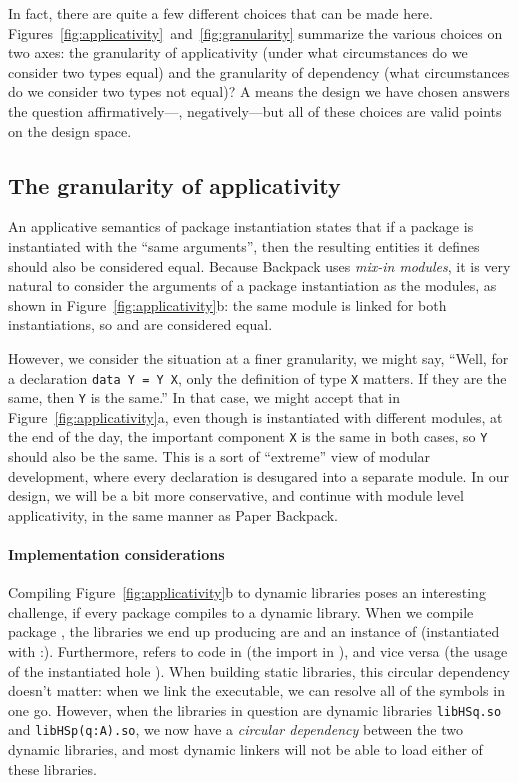 \documentclass{article}
\begin{document}
In fact, there are quite a few different choices that can be made here.
Figures~\ref{fig:applicativity}~and~\ref{fig:granularity} summarize the various
choices on two axes: the granularity of applicativity (under what circumstances
do we consider two types equal) and the granularity of dependency (what circumstances
do we consider two types not equal)?  A  means the design we have chosen
answers the question affirmatively---, negatively---but all of these choices
are valid points on the design space.

\subsection{The granularity of applicativity}

An applicative semantics of package instantiation states that if a package is
instantiated with the ``same arguments'', then the resulting entities it defines
should also be considered equal.  Because Backpack uses \emph{mix-in modules},
it is very natural to consider the arguments of a package instantiation as the
modules, as shown in Figure~\ref{fig:applicativity}b: the same module  is
linked for both instantiations, so  and  are considered equal.

However, we consider the situation at a finer granularity, we might say, ``Well,
for a declaration \texttt{data Y = Y X}, only the definition of type \verb|X| matters.
If they are the same, then \verb|Y| is the same.''  In that case, we might accept
that in Figure~\ref{fig:applicativity}a, even though  is instantiated
with different modules, at the end of the day, the important component \verb|X| is
the same in both cases, so \verb|Y| should also be the same.  This is a sort of
``extreme'' view of modular development, where every declaration is desugared
into a separate module.  In our design, we will be a bit more conservative, and
continue with module level applicativity, in the same manner as Paper Backpack.

\paragraph{Implementation considerations}
Compiling Figure~\ref{fig:applicativity}b to dynamic libraries poses an
interesting challenge, if every package compiles to a dynamic library.
When we compile package , the libraries we end up producing are 
and an instance of  (instantiated with :).  Furthermore,
 refers to code in  (the import in ), and vice versa (the usage
of the instantiated hole ).  When building static libraries, this circular
dependency doesn't matter: when we link the executable, we can resolve all
of the symbols in one go.  However, when the libraries in question are
dynamic libraries \verb|libHSq.so| and \verb|libHSp(q:A).so|, we now have
a \emph{circular dependency} between the two dynamic libraries, and most dynamic
linkers will not be able to load either of these libraries.
\end{document}
